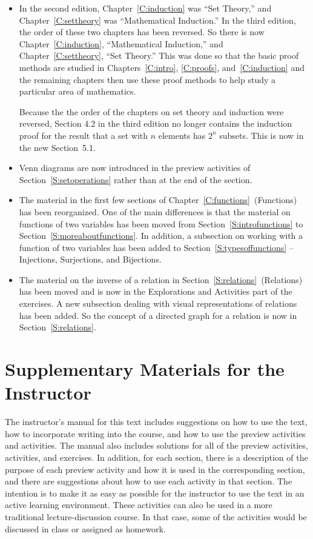 \begin{itemize}
  \item In the second edition, Chapter~\ref{C:induction} was ``Set Theory,'' and Chapter~\ref{C:settheory} was ``Mathematical Induction.'' In the third edition, the order of these two chapters has been reversed.  So there is now Chapter~\ref{C:induction}, ``Mathematical Induction,'' and Chapter~\ref{C:settheory}, ``Set Theory.''  This was done so that the basic proof methods are studied in Chapters~\ref{C:intro}, \ref{C:proofs}, and~\ref{C:induction} and the remaining chapters then use these proof methods to help study a particular area of mathematics.

Because the the order of the chapters on set theory and induction were reversed, Section 4.2 in the third edition no longer contains the induction proof for the result that a set with $n$ elements has $2^n$ subsets.  This is now in the new Section~5.1.
  \item Venn diagrams are now introduced in the preview activities of Section~\ref{S:setoperations} rather than at the end of the section.
  \item The material in the first few sections of Chapter~\ref{C:functions}~(Functions) has been reorganized.  One of the main differences is that the material on functions of two variables has been moved from Section~\ref{S:introfunctions} to Section~\ref{S:moreaboutfunctions}.  In addition, a subsection on working with a function of two variables has been added to Section~\ref{S:typesoffunctions} -- Injections, Surjections, and Bijections.
  \item The material on the inverse of a relation in Section~\ref{S:relations}~(Relations) has been moved and is now in the Explorations and Activities part of the exercises.  A new subsection dealing with visual representations of relations has been added.  So the concept of a directed graph for a relation is now in Section~\ref{S:relations}.
\end{itemize}



\section*{Supplementary Materials for the Instructor}
The instructor's manual for this text includes suggestions on how to use the text, how to incorporate writing into the course, and how to use the preview activities and activities.  The manual also includes solutions for all of the preview activities, activities, and exercises.  In addition, for each section, there is a description of the purpose of each preview activity and how it is used in the corresponding section, and there are suggestions about how to use each activity in that section.  The intention is to make it as easy as possible for the instructor to use the text in an active learning environment.  These activities can also be used in a more traditional lecture-discussion course.  In that case, some of the activities would be discussed in class or assigned as homework.

